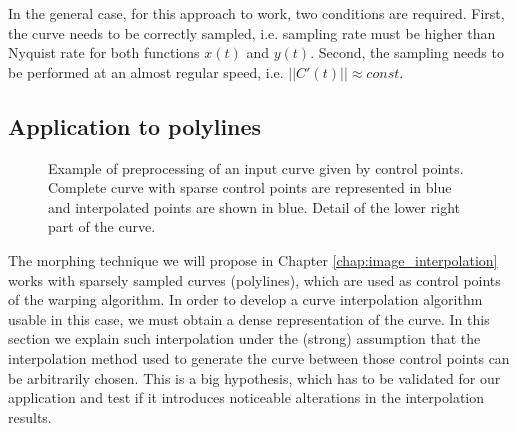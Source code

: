 \documentclass{ipol}
\newcommand{\chapFiveDir}{images/chapter_05a}
\begin{document}
In the general case, for this approach to work, two conditions are required. First, the curve needs to be correctly sampled, i.e. sampling rate must be higher than Nyquist rate for both functions $x(t)$ and $y(t)$.
Second, the sampling needs to be performed at an almost regular speed, i.e. $||C'(t)|| \approx const.$

\subsection{Application to polylines}\label{sec:curve_interpolation:curve_reconstruction:polylines}

\begin{figure}[h]
	\centering
	\caption{Example of preprocessing of an input curve given by control points. 
		\protect{} Complete curve with sparse control points are represented in blue and interpolated points are shown in blue.
		\protect{} Detail of the lower right part of the curve.
	}
	\label{fig:curve_interpolation:control_points}
\end{figure}

The morphing technique we will propose in Chapter \ref{chap:image_interpolation} works with sparsely sampled curves (polylines), which are used as control points of the warping algorithm. In order to develop a curve interpolation algorithm usable in this case, we must obtain a dense representation of the curve. In this section we explain such interpolation under the (strong) assumption that the interpolation method used to generate  the curve between those control points can be arbitrarily chosen. This is a big hypothesis, which has to be validated for our application and test if it introduces noticeable alterations in the interpolation results.
\end{document}
